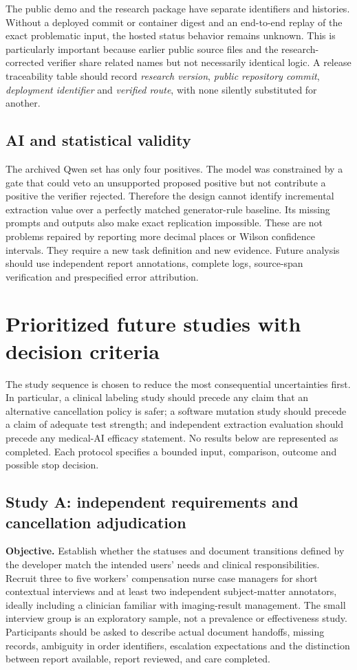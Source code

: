 \documentclass[11pt,twocolumn]{article}
\begin{document}
The public demo and the research package have separate identifiers and histories. Without a deployed commit or container digest and an end-to-end replay of the exact problematic input, the hosted status behavior remains unknown. This is particularly important because earlier public source files and the research-corrected verifier share related names but not necessarily identical logic. A release traceability table should record \emph{research version}, \emph{public repository commit}, \emph{deployment identifier} and \emph{verified route}, with none silently substituted for another.

\subsection{AI and statistical validity}
The archived Qwen set has only four positives. The model was constrained by a gate that could veto an unsupported proposed positive but not contribute a positive the verifier rejected. Therefore the design cannot identify incremental extraction value over a perfectly matched generator-rule baseline. Its missing prompts and outputs also make exact replication impossible. These are not problems repaired by reporting more decimal places or Wilson confidence intervals. They require a new task definition and new evidence. Future analysis should use independent report annotations, complete logs, source-span verification and prespecified error attribution.

\section{Prioritized future studies with decision criteria}\label{sec:future}
The study sequence is chosen to reduce the most consequential uncertainties first. In particular, a clinical labeling study should precede any claim that an alternative cancellation policy is safer; a software mutation study should precede a claim of adequate test strength; and independent extraction evaluation should precede any medical-AI efficacy statement. No results below are represented as completed. Each protocol specifies a bounded input, comparison, outcome and possible stop decision.

\subsection{Study A: independent requirements and cancellation adjudication}
\textbf{Objective.} Establish whether the statuses and document transitions defined by the developer match the intended users' needs and clinical responsibilities. Recruit three to five workers' compensation nurse case managers for short contextual interviews and at least two independent subject-matter annotators, ideally including a clinician familiar with imaging-result management. The small interview group is an exploratory sample, not a prevalence or effectiveness study. Participants should be asked to describe actual document handoffs, missing records, ambiguity in order identifiers, escalation expectations and the distinction between report available, report reviewed, and care completed.
\end{document}
